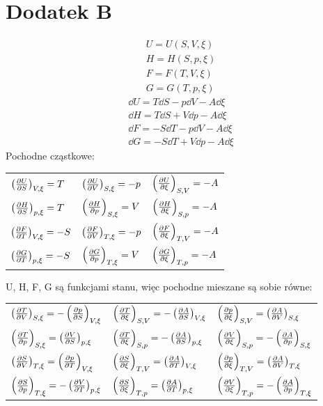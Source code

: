 \documentclass[10pt, a4paper, twoside, onecolumn]{article}
\numberwithin{equation}{section}
\begin{document}
	\section{Dodatek B}
	\begin{gather}
		U=U\left(S, V, \xi\right) \\
		H=H\left(S, p, \xi\right) \\
		F=F\left(T, V, \xi\right) \\
		G=G\left(T, p, \xi\right)
	\end{gather}
	\begin{gather}
		\dd{U}=T\dd{S}-p\dd{V}-A\dd{\xi} \\
		\dd{H}=T\dd{S}+V\dd{p}-A\dd{\xi} \\
		\dd{F}=-S\dd{T}-p\dd{V}-A\dd{\xi} \\
		\dd{G}=-S\dd{T}+V\dd{p}-A\dd{\xi}
	\end{gather}
	Pochodne cząstkowe:
	\begin{table}[H]
	\centering
	\begin{tabular}{lll}
		\(\left(\pdv{U}{S}\right)_{V, \xi}=T\) & \(\left(\pdv{U}{V}\right)_{S, \xi}=-p\) & \(\left(\pdv{U}{\xi}\right)_{S, V}=-A\) \\
		\(\left(\pdv{H}{S}\right)_{p, \xi}=T\) & \(\left(\pdv{H}{p}\right)_{S, \xi}=V\) & \(\left(\pdv{H}{\xi}\right)_{S, p}=-A\) \\
		\(\left(\pdv{F}{T}\right)_{V, \xi}=-S\) & \(\left(\pdv{F}{V}\right)_{T, \xi}=-p\) & \(\left(\pdv{F}{\xi}\right)_{T, V}=-A\) \\
		\(\left(\pdv{G}{T}\right)_{p, \xi}=-S\) & \(\left(\pdv{G}{p}\right)_{T, \xi}=V\) & \(\left(\pdv{G}{\xi}\right)_{T, p}=-A\) \\
	\end{tabular}
	\end{table}
	U, H, F, G są funkcjami stanu, więc pochodne mieszane są sobie równe:
	\begin{table}[H]
	\centering
	\begin{tabular}{lll}
		\(\left(\pdv{T}{V}\right)_{S, \xi}=-\left(\pdv{p}{S}\right)_{V, \xi}\) & \(\left(\pdv{T}{\xi}\right)_{S, V}=-\left(\pdv{A}{S}\right)_{V, \xi}\) & \(\left(\pdv{p}{\xi}\right)_{S, V}=\left(\pdv{A}{V}\right)_{S, \xi}\) \\
		\(\left(\pdv{T}{p}\right)_{S, \xi}=\left(\pdv{V}{S}\right)_{p, \xi}\) & \(\left(\pdv{T}{\xi}\right)_{S, p}=-\left(\pdv{A}{S}\right)_{p, \xi}\) & \(\left(\pdv{V}{\xi}\right)_{S, p}=-\left(\pdv{A}{p}\right)_{S, \xi}\) \\
		\(\left(\pdv{S}{V}\right)_{T, \xi}=\left(\pdv{p}{T}\right)_{V, \xi}\) & \(\left(\pdv{S}{\xi}\right)_{T, V}=\left(\pdv{A}{T}\right)_{V, \xi}\) & \(\left(\pdv{p}{\xi}\right)_{T, V}=\left(\pdv{A}{V}\right)_{T, \xi}\) \\
		\(\left(\pdv{S}{p}\right)_{T, \xi}=-\left(\pdv{V}{T}\right)_{p, \xi}\) & \(\left(\pdv{S}{\xi}\right)_{T, p}=\left(\pdv{A}{T}\right)_{p, \xi}\) & \(\left(\pdv{V}{\xi}\right)_{T, p}=-\left(\pdv{A}{p}\right)_{T, \xi}\)
	\end{tabular}
	\end{table}
\end{document}
